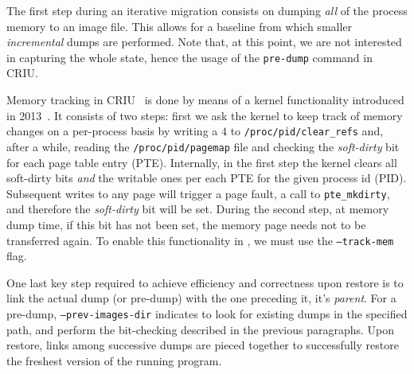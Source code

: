 The first step during an iterative migration consists on dumping \emph{all} of
the process memory to an image file.
This allows for a baseline from which smaller \emph{incremental} dumps are
performed.
Note that, at this point, we are not interested in capturing the whole state,
hence the usage of the \texttt{pre-dump} command in CRIU.

Memory tracking in CRIU~\cite{criu-memory-tracking} is done by means of a
kernel functionality introduced in 2013~\cite{criu-memory-tracking-lwn}.
It consists of two steps: first we ask the kernel to keep track of memory
changes on a per-process basis by writing a $4$ to
\texttt{/proc/pid/clear\_refs} and, after a while, reading the
\texttt{/proc/pid/pagemap} file and checking the \textit{soft-dirty} bit for
each page table entry (PTE).
Internally, in the first step the kernel clears all soft-dirty bits \emph{and}
the writable ones per each PTE for the given process id (PID).
Subsequent writes to any page will trigger a page fault, a call to
\texttt{pte\_mkdirty}, and therefore the \textit{soft-dirty} bit will be set.
During the second step, at memory dump time, if this bit has not been set, the
memory page needs not to be transferred again.
To enable this functionality in \criu, we must use the \texttt{--track-mem}
flag.

One last key step required to achieve efficiency and correctness upon restore
is to link the actual dump (or pre-dump) with the one preceding it, it's
\emph{parent}.
For a pre-dump, \texttt{--prev-images-dir} indicates \criu to look for existing
dumps in the specified path, and perform the bit-checking described in the
previous paragraphs.
Upon restore, links among successive dumps are pieced together to successfully
restore the freshest version of the running program.

